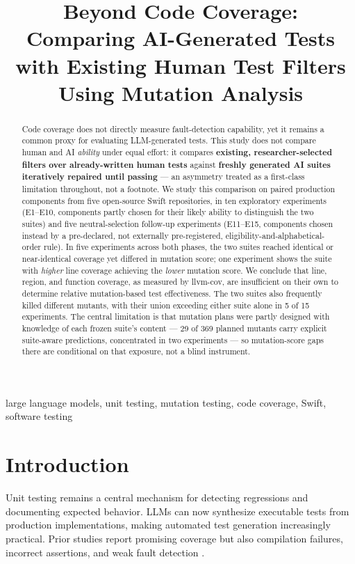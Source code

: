 \documentclass[10pt,conference]{IEEEtran}
\title{Beyond Code Coverage: Comparing AI-Generated Tests with Existing Human Test Filters Using Mutation Analysis}
\author{\IEEEauthorblockN{Premal Mistry, Randhir Kumar}
\IEEEauthorblockA{Independent Researcher}}
\begin{document}
\maketitle

\begin{abstract}
Code coverage does not directly measure fault-detection capability, yet it remains a common proxy for evaluating LLM-generated tests. This study does not compare human and AI \emph{ability} under equal effort: it compares \textbf{existing, researcher-selected filters over already-written human tests} against \textbf{freshly generated AI suites iteratively repaired until passing} --- an asymmetry treated as a first-class limitation throughout, not a footnote. We study this comparison on paired production components from five open-source Swift repositories, in ten exploratory experiments (E1--E10, components partly chosen for their likely ability to distinguish the two suites) and five neutral-selection follow-up experiments (E11--E15, components chosen instead by a pre-declared, not externally pre-registered, eligibility-and-alphabetical-order rule). In five experiments across both phases, the two suites reached identical or near-identical coverage yet differed in mutation score; one experiment shows the suite with \emph{higher} line coverage achieving the \emph{lower} mutation score. We conclude that line, region, and function coverage, as measured by llvm-cov, are insufficient on their own to determine relative mutation-based test effectiveness. The two suites also frequently killed different mutants, with their union exceeding either suite alone in 5 of 15 experiments. The central limitation is that mutation plans were partly designed with knowledge of each frozen suite's content --- 29 of 369 planned mutants carry explicit suite-aware predictions, concentrated in two experiments --- so mutation-score gaps there are conditional on that exposure, not a blind instrument.
\end{abstract}

\begin{IEEEkeywords}
large language models, unit testing, mutation testing, code coverage, Swift, software testing
\end{IEEEkeywords}

\section{Introduction}
\label{sec:introduction}
Unit testing remains a central mechanism for detecting regressions and documenting expected behavior. LLMs can now synthesize executable tests from production implementations, making automated test generation increasingly practical. Prior studies report promising coverage but also compilation failures, incorrect assertions, and weak fault detection \cite{yuan2023}.
\end{document}
